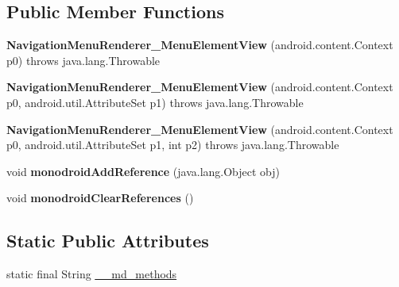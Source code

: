 \subsection*{Public Member Functions}
\begin{DoxyCompactItemize}
\item 
\mbox{\label{classmd5b60ffeb829f638581ab2bb9b1a7f4f3f_1_1NavigationMenuRenderer__MenuElementView_a0c5cb8c6adfb8c38c5cafccdc1af874f}} 
{\bfseries Navigation\+Menu\+Renderer\+\_\+\+Menu\+Element\+View} (android.\+content.\+Context p0)  throws java.\+lang.\+Throwable 	
\item 
\mbox{\label{classmd5b60ffeb829f638581ab2bb9b1a7f4f3f_1_1NavigationMenuRenderer__MenuElementView_aebec519cc030b32200fdeb7e7e7b1a10}} 
{\bfseries Navigation\+Menu\+Renderer\+\_\+\+Menu\+Element\+View} (android.\+content.\+Context p0, android.\+util.\+Attribute\+Set p1)  throws java.\+lang.\+Throwable 	
\item 
\mbox{\label{classmd5b60ffeb829f638581ab2bb9b1a7f4f3f_1_1NavigationMenuRenderer__MenuElementView_a323eade9a3ca095a1c86090dcd3ae204}} 
{\bfseries Navigation\+Menu\+Renderer\+\_\+\+Menu\+Element\+View} (android.\+content.\+Context p0, android.\+util.\+Attribute\+Set p1, int p2)  throws java.\+lang.\+Throwable 	
\item 
\mbox{\label{classmd5b60ffeb829f638581ab2bb9b1a7f4f3f_1_1NavigationMenuRenderer__MenuElementView_addd20286455393e3d32e5f4697d6b870}} 
void {\bfseries monodroid\+Add\+Reference} (java.\+lang.\+Object obj)
\item 
\mbox{\label{classmd5b60ffeb829f638581ab2bb9b1a7f4f3f_1_1NavigationMenuRenderer__MenuElementView_a34c2e11f6c978d883b8411da596cc99d}} 
void {\bfseries monodroid\+Clear\+References} ()
\end{DoxyCompactItemize}
\subsection*{Static Public Attributes}
\begin{DoxyCompactItemize}
\item 
static final String \hyperlink{classmd5b60ffeb829f638581ab2bb9b1a7f4f3f_1_1NavigationMenuRenderer__MenuElementView_a04d38a07cbc75040c62aaa944c9b4174}{\+\_\+\+\_\+md\+\_\+methods}
\end{DoxyCompactItemize}
